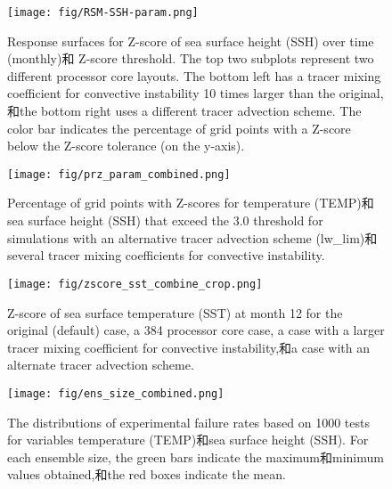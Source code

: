 \clearpage
\begin {figure}[h]
\centering
\texttt{[image: fig/RSM-SSH-param.png]}
\caption {Response surfaces for Z-score of sea surface height (SSH) over time (monthly)和 Z-score threshold.  The top two subplots represent two different processor core layouts.
The bottom left has a tracer mixing coefficient for convective instability 10 times larger than the original,和the bottom right uses a different tracer advection scheme. The color bar indicates the percentage of grid points with a Z-score below the Z-score tolerance (on the y-axis).}
\label{fig:RSM-SSH-param}
\end {figure}


\clearpage
\begin{figure}[h]
\centering
\texttt{[image: fig/prz\_param\_combined.png]}
\caption{Percentage of grid points with Z-scores for temperature
  (TEMP)和sea surface height (SSH) that exceed the 3.0 threshold for simulations with an alternative tracer advection scheme (lw\_lim)和several tracer mixing coefficients for convective instability.}
\label {fig:PRZ-temp-param}
\end{figure}


\clearpage
\begin {figure}[h]
\centering
\texttt{[image: fig/zscore\_sst\_combine\_crop.png]}
\caption{Z-score of sea surface temperature (SST) at month 12 for the
original (default) case, a 384 processor core case, a case with a
  larger tracer mixing coefficient for convective instability,和a case with an alternate tracer advection scheme.}
\label {fig:zscore-combine}
\end {figure}

\clearpage
\begin {figure}[h]
\centering
\texttt{[image: fig/ens\_size\_combined.png]}
\caption{The distributions of experimental failure rates based on 1000 tests for variables temperature (TEMP)和sea surface height (SSH).  For each ensemble size, the green bars indicate the maximum和minimum values obtained,和the red boxes indicate the mean.   }
 \label {fig:temp_ens_80}
\end {figure}




 

